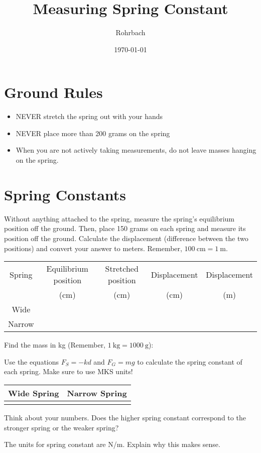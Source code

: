 \documentclass[10pt]{exam}
\title{Measuring Spring Constant}
\author{Rohrbach}
\date{\today}
\begin{document}
\maketitle

\section*{Ground Rules}
\begin{itemize}
  \item NEVER stretch the spring out with your hands
  \item NEVER place more than 200 grams on the spring
  \item When you are not actively taking measurements, do not leave masses hanging on the spring.
  
\end{itemize}

\section*{Spring Constants}

\begin{questions}

\question
  Without anything attached to the spring, measure the spring's equilibrium position off the ground.  Then, place 150 grams on each spring and measure its position off the ground.  Calculate the displacement (difference between the two positions) and convert your answer to meters.  Remember, $\SI{100}{\centi\meter}=\SI{1}{\meter}$.
  \begin{center}
    \renewcommand{\arraystretch}{2}
    \begin{tabular}{|c|c|c|c|c|}
      \hline
      Spring & 
      Equilibrium position &
      Stretched position & 
      Displacement &
      Displacement \\[-1em]
      & (cm) & (cm) & (cm) & (m)
      \\ \hline
      Wide   & & & & \\ \hline
      Narrow & & & & \\ \hline
    \end{tabular}
  \end{center}

\question
  Find the mass in kg (Remember, $\SI{1}{\kilo\gram}=\SI{1000}{\gram}$):  \fillin[][8em]

\question
  Use the equations $F_S=-kd$ and $F_G=mg$ to calculate the spring constant of each spring.  Make sure to use MKS units!

  \begin{tabular}{p{2.8in}|p{2.8in}} 
    \hline
    Wide Spring & Narrow Spring \\\hline
    &\\[15em]
  \end{tabular}


\question
  Think about your numbers.  Does the higher spring constant correspond to the stronger spring or the weaker spring?
  \vs 

\question
  The units for spring constant are N/m.  Explain why this makes sense.
  \vs 
  
\end{questions}
\end{document}
